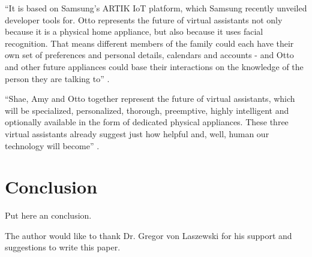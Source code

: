 ``It is based on Samsung's ARTIK IoT platform, which Samsung recently unveiled developer tools for. Otto represents the future of virtual assistants not only because it is a physical home appliance, but also because it uses facial recognition. That means different members of the family could each have their own set of preferences and personal details, calendars and accounts - and Otto and other future appliances could base their interactions on the knowledge of the person they are talking to'' \cite{Elgan2016future}.

``Shae, Amy and Otto together represent the future of virtual assistants, which will be specialized, personalized, thorough, preemptive, highly intelligent and optionally available in the form of dedicated physical appliances. These three virtual assistants already suggest just how helpful and, well, human our technology will become'' \cite{Elgan2016future}.

\section{Conclusion}

Put here an conclusion. 

\begin{acks}

  The author would like to thank Dr. Gregor von Laszewski for his
  support and suggestions to write this paper.

\end{acks}


 
